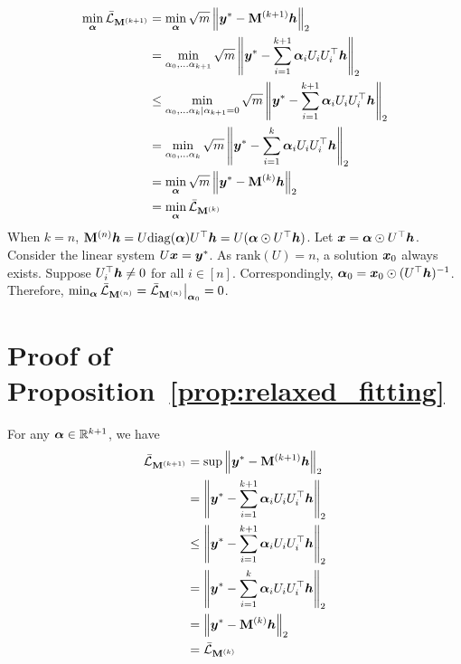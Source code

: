 \documentclass{article} %
\def\valpha{{\bm\alpha}}
\begin{document}
\begin{equation}
	\begin{aligned}
		\min_{\valpha}\bar\gL_{\rmM^{(k+1)}}&=\min_{\valpha}\sqrt{m}\left\|\vy^*-\rmM^{(k+1)}\vh\right\|_2\\
		&=\min_{\alpha_0,\dots\alpha_{k+1}}\sqrt{m}\left\|\vy^*-\sum_{i=1}^{k+1}\valpha_iU_iU_i^{\top}\vh\right\|_2\\
		&\leq\min_{\alpha_0,\dots\alpha_k|\alpha_{k+1}=0}\sqrt{m}\left\|\vy^*-\sum_{i=1}^{k+1}\valpha_iU_iU_i^{\top}\vh\right\|_2\\
		&=\min_{\alpha_0,\dots\alpha_k}\sqrt{m}\left\|\vy^*-\sum_{i=1}^k\valpha_iU_iU_i^{\top}\vh\right\|_2\\
		&=\min_{\valpha}\sqrt{m}\left\|\vy^*-\rmM^{(k)}\vh\right\|_2\\
		&=\min_{\valpha}\bar\gL_{\rmM^{(k)}}
	\end{aligned}
\end{equation}
When $k=n$, $\rmM^{(n)}\vh=U\mathrm{diag}(\valpha)U^{\top}\vh=U(\valpha\odot U^{\top}\vh)$.
Let $\vx=\valpha\odot U^{\top}\vh$.
Consider the linear system $U{\bm{x}}={\bm{y}}^*$.
As $\mathrm{rank}(U)=n$, a solution ${\bm{x}}_0$ always exists.
Suppose $U_i^{\top}{\bm{h}}\neq0$ for all $i\in[n]$.
Correspondingly, $\valpha_0=\vx_0\odot(U^{\top}\vh)^{-1}$.
Therefore, $\min_{\valpha}\bar\gL_{\rmM^{(n)}}=\bar\gL_{\rmM^{(n)}}\big|_{\valpha_0}=0$.


\section{Proof of Proposition~\ref{prop:relaxed_fitting}}
\label{sec:relaxed_fitting2}

For any $\valpha\in\sR^{k+1}$, we have
\begin{equation}
	\begin{aligned}
		\bar\gL_{\rmM^{(k+1)}}&=\sup\left\|\vy^*-\rmM^{(k+1)}\vh\right\|_2\\
		&=\left\|\vy^*-\sum_{i=1}^{k+1}\valpha_iU_iU_i^{\top}\vh\right\|_2\\
		&\leq\left\|\vy^*-\sum_{i=1}^{k+1}\valpha_iU_iU_i^{\top}\vh\right\|_2\\
		&=\left\|\vy^*-\sum_{i=1}^k\valpha_iU_iU_i^{\top}\vh\right\|_2\\
		&=\left\|\vy^*-\rmM^{(k)}\vh\right\|_2\\
		&=\bar\gL_{\rmM^{(k)}}
	\end{aligned}
\end{equation}


\newpage
\end{document}
